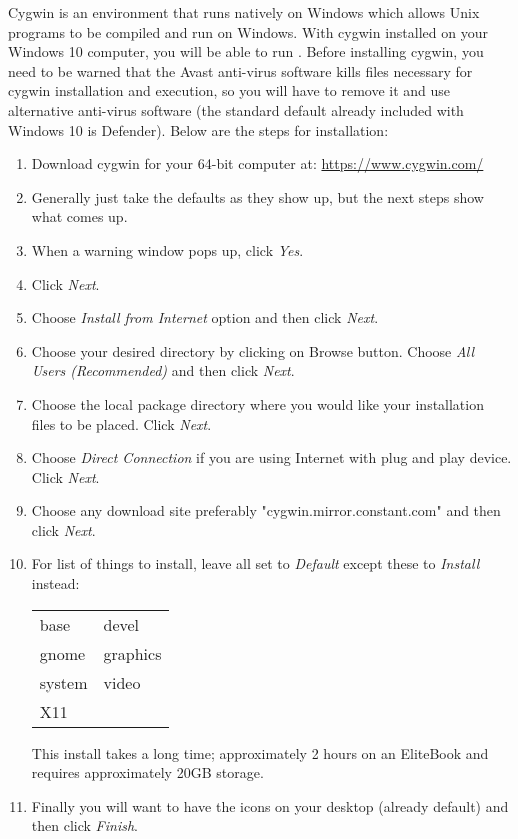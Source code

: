 Cygwin is an environment that runs natively on Windows which allows Unix programs to be compiled 
and run on Windows.  With cygwin installed on your Windows 10 computer, you will be able to run 
\CGG{}.  Before installing cygwin, you need to be warned that the Avast anti-virus software 
kills files necessary for cygwin installation and execution, so you will have to remove it and 
use alternative anti-virus software (the standard default already included with Windows 10 
is Defender). Below are the steps for installation:

\begin{enumerate}
	\item Download cygwin for your 64-bit computer at: {\small \url{https://www.cygwin.com/}}
	\item Generally just take the defaults as they show up, but the next steps show what comes up.
	\item When a warning window pops up, click \textit{Yes}.
	\item Click \textit{Next}.
	\item Choose \textit{Install from Internet} option and then click \textit{Next}.
	\item Choose your desired directory by clicking on Browse button. Choose \textit{All Users (Recommended)} and then click \textit{Next}.
	\item Choose the local package directory where you would like your installation files to be placed. Click \textit{Next}.
	\item Choose \textit{Direct Connection} if you are using Internet with plug and play device. Click \textit{Next}.
	\item Choose any download site preferably "cygwin.mirror.constant.com" and then click \textit{Next}.
	\item For list of things to install, leave all set to \textit{Default} except these to \textit{Install} instead:

\begin{tabular}{ll}
	base& devel\\
	gnome& graphics\\
	system& video\\
	X11 \\
\end{tabular}

     This install takes a long time; approximately 2 hours on an EliteBook and requires approximately 20GB storage.
	\item Finally you will want to have the icons on your desktop (already default) and then click \textit{Finish}.
\end{enumerate}

